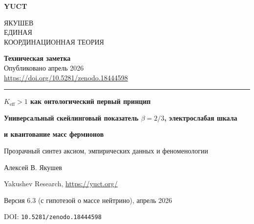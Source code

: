 \documentclass[11pt,a4paper]{article}
\newcommand{\makeheader}{%
	\noindent
	\begin{minipage}{0.17\textwidth}
		\raggedright
		{\sffamily\bfseries\color{skyblue}\fontsize{46}{46}\selectfont YUCT}%
	\end{minipage}%
	\hspace{30pt}
	\begin{minipage}{0.32\textwidth}
		\raggedright
		{\sffamily\fontsize{11}{13}\selectfont ЯКУШЕВ\\ ЕДИНАЯ\\ КООРДИНАЦИОННАЯ ТЕОРИЯ}%
	\end{minipage}%
	\hfill
	\begin{minipage}{0.38\textwidth}
		\raggedleft
		{\sffamily\bfseries Техническая заметка}\\
		{\sffamily Опубликовано апрель 2026}\\
		{\sffamily\footnotesize \scriptsize\url{https://doi.org/10.5281/zenodo.18444598}}%
	\end{minipage}
	\par\vspace{5pt}
	\noindent\textcolor{gold}{\rule{\textwidth}{1.6pt}}
	\par\vspace{0pt}
}
\begin{document}
	
		\makeheader
		\centering
		\vspace*{1cm}
		
		{\Huge\bfseries \(K_{\mathrm{eff}} > 1\) как онтологический первый принцип\par}
		\vspace{0.3cm}
		{\Large\bfseries Универсальный скейлинговый показатель \(\beta = 2/3\), электрослабая шкала\par}
		\vspace{0.1cm}
		{\Large\bfseries и квантование масс фермионов\par}
		\vspace{0.5cm}
		{\large Прозрачный синтез аксиом, эмпирических данных и феноменологии\par}
		
		\vspace{1cm}
		
		{\large Алексей В. Якушев\par}
		\vspace{0.3cm}
		{\normalsize Yakushev Research, \url{https://yuct.org/}\par}
		
		\vspace{1.0cm}
		
		{\normalsize Версия 6.3 (с гипотезой о массе нейтрино), апрель 2026\par}
		\vspace{0.3cm}
		{\normalsize DOI: \texttt{10.5281/zenodo.18444598}\par}
		
		\vfill
		
\end{document}
